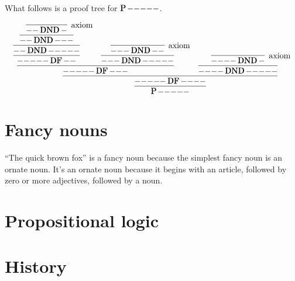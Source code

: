 \documentclass[11pt,letterpaper]{article}
\DeclareMathOperator{\isprime}{\mathqd{P}}
\DeclareMathOperator{\df}{\mathqd{DF}}
\DeclareMathOperator{\dnd}{\mathqd{DND}}
\newcommand{\hy}{\mathtt{-}}
\begin{document}
What follows is a proof tree for $\isprime \hy\hy\hy\hy\hy$.

\begin{equation*}
  \infer{\isprime \hy\hy\hy\hy\hy}{
    \infer{\hy\hy\hy\hy\hy \df \hy\hy\hy\hy}{
      \infer{\hy\hy\hy\hy\hy \df \hy\hy\hy}{
        \infer{\hy\hy\hy\hy\hy \df \hy\hy}{
          \infer{\hy\hy \dnd \hy\hy\hy\hy\hy}{
            \infer{\hy\hy \dnd \hy\hy\hy}{
              \infer[\text{axiom}]{\hy\hy \dnd \hy}{}
            }
          }
        }
        &
        \infer{\hy\hy\hy \dnd \hy\hy\hy\hy\hy}{
          \infer[\text{axiom}]{\hy\hy\hy \dnd \hy\hy}{}
        }
      }
      &
      \infer{\hy\hy\hy\hy \dnd \hy\hy\hy\hy\hy}{
        \infer[\text{axiom}]{\hy\hy\hy\hy \dnd \hy}{}
      }
    }
  }
\end{equation*}

\section{Fancy nouns}

``The quick brown fox'' is a fancy noun because the simplest fancy noun is an
ornate noun. It's an ornate noun because it begins with an article, followed by
zero or more adjectives, followed by a noun.

\section{Propositional logic}



\section{History}
\end{document}
